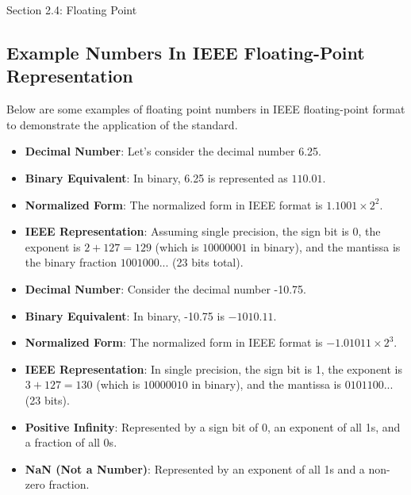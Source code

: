 \begin{notes}{Section 2.4: Floating Point}
    \subsection*{Example Numbers In IEEE Floating-Point Representation}

    Below are some examples of floating point numbers in IEEE floating-point format to demonstrate the application of the standard.

    \begin{highlight}
        \begin{itemize}
            \item \textbf{Decimal Number}: Let's consider the decimal number 6.25.
            \item \textbf{Binary Equivalent}: In binary, 6.25 is represented as $110.01$.
            \item \textbf{Normalized Form}: The normalized form in IEEE format is $1.1001 \times 2^2$.
            \item \textbf{IEEE Representation}: Assuming single precision, the sign bit is 0, the exponent is $2 + 127 = 129$ (which is $10000001$ in binary), and the mantissa is the binary fraction 
            $1001000...$ (23 bits total).
        \end{itemize}
    \end{highlight}

    \begin{highlight}
        \begin{itemize}
            \item \textbf{Decimal Number}: Consider the decimal number -10.75.
            \item \textbf{Binary Equivalent}: In binary, -10.75 is $-1010.11$.
            \item \textbf{Normalized Form}: The normalized form in IEEE format is $-1.01011 \times 2^3$.
            \item \textbf{IEEE Representation}: In single precision, the sign bit is 1, the exponent is $3 + 127 = 130$ (which is $10000010$ in binary), and the mantissa is $0101100...$ (23 bits).
        \end{itemize}
    \end{highlight}

    \begin{highlight}
        \begin{itemize}
            \item \textbf{Positive Infinity}: Represented by a sign bit of 0, an exponent of all 1s, and a fraction of all 0s.
            \item \textbf{NaN (Not a Number)}: Represented by an exponent of all 1s and a non-zero fraction.
        \end{itemize}
    \end{highlight}
    

\end{notes}
